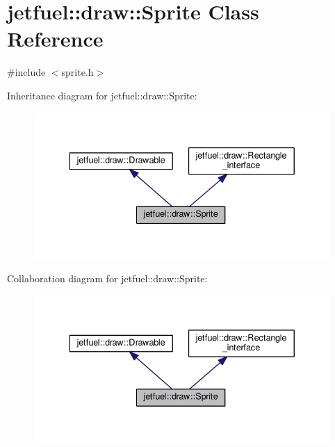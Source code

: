\hypertarget{classjetfuel_1_1draw_1_1Sprite}{}\section{jetfuel\+:\+:draw\+:\+:Sprite Class Reference}
\label{classjetfuel_1_1draw_1_1Sprite}


{\ttfamily \#include $<$sprite.\+h$>$}



Inheritance diagram for jetfuel\+:\+:draw\+:\+:Sprite\+:
\nopagebreak
\begin{figure}[H]
\begin{center}
\leavevmode
\includegraphics[width=336pt]{classjetfuel_1_1draw_1_1Sprite__inherit__graph}
\end{center}
\end{figure}


Collaboration diagram for jetfuel\+:\+:draw\+:\+:Sprite\+:
\nopagebreak
\begin{figure}[H]
\begin{center}
\leavevmode
\includegraphics[width=336pt]{classjetfuel_1_1draw_1_1Sprite__coll__graph}
\end{center}
\end{figure}
